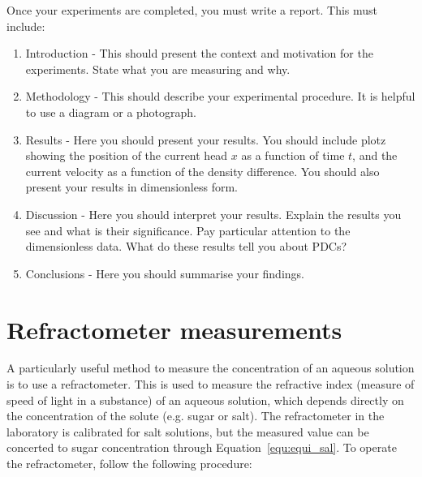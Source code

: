 \documentclass[]{article}
\theoremstyle{definition}
\begin{document}
Once your experiments are completed, you must write a report. This must include:

\begin{enumerate}
\item Introduction - This should present the context and motivation for the experiments. State what you are measuring and why.
\item Methodology - This should describe your experimental procedure. It is helpful to use a diagram or a photograph.
\item Results - Here you should present your results. You should include plotz showing the position of the current head $x$ as a function of time $t$, and the current velocity as a function of the density difference. You should also present your results in dimensionless form.
\item Discussion - Here you should interpret your results. Explain the results you see and what is their significance. Pay particular attention to the dimensionless data. What do these results tell you about PDCs?
\item Conclusions - Here you should summarise your findings.
\end{enumerate}

\appendix

\section{Refractometer measurements}
\label{app:refract}

A particularly useful method to measure the concentration of an aqueous solution is to use a refractometer. This is used to measure the refractive index (measure of speed of light in a substance) of an aqueous solution, which depends directly on the concentration of the solute (e.g. sugar or salt). The refractometer in the laboratory is calibrated for salt solutions, but the measured value can be concerted to sugar concentration through Equation~\ref{equ:equi_sal}. To operate the refractometer, follow the following procedure:
\end{document}
